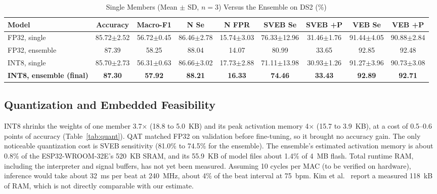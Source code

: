 \documentclass[conference]{IEEEtran}
\begin{document}
\begin{table}[t]
\caption{Single Members (Mean $\pm$ SD, $n=3$) Versus the Ensemble on DS2 (\%)}
\label{tab:ensemble}
\centering
\footnotesize
\begin{tabular}{@{}lcccccccc@{}}
\toprule
Model & Accuracy & Macro-F1 & N Se & N FPR & SVEB Se & SVEB +P & VEB Se & VEB +P \\
\midrule
FP32, single & 85.72$\pm$2.52 & 56.72$\pm$0.45 & 86.46$\pm$2.78 & 15.74$\pm$3.03 & 76.33$\pm$12.96 & 31.46$\pm$1.76 & 91.44$\pm$4.05 & 90.88$\pm$2.84 \\
FP32, ensemble & 87.39 & 58.25 & 88.04 & 14.07 & 80.99 & 33.65 & 92.85 & 92.48 \\
INT8, single & 85.70$\pm$2.73 & 56.31$\pm$0.63 & 86.66$\pm$3.02 & 17.73$\pm$2.88 & 71.11$\pm$13.98 & 30.93$\pm$1.26 & 91.27$\pm$3.96 & 90.73$\pm$3.08 \\
\textbf{INT8, ensemble (final)} & \textbf{87.30} & \textbf{57.92} & \textbf{88.21} & \textbf{16.33} & \textbf{74.46} & \textbf{33.43} & \textbf{92.89} & \textbf{92.71} \\
\bottomrule
\end{tabular}
\end{table}

\subsection{Quantization and Embedded Feasibility}
INT8 shrinks the weights of one member 3.7$\times$ (18.8 to 5.0~KB) and its peak activation memory 4$\times$ (15.7 to 3.9~KB), at a cost of 0.5--0.6 points of accuracy (Table~\ref{tab:quant}). QAT matched FP32 on validation before fine-tuning, so it brought no accuracy gain. The only noticeable quantization cost is SVEB sensitivity (81.0\% to 74.5\% for the ensemble). The ensemble's estimated activation memory is about 0.8\% of the ESP32-WROOM-32E's 520~KB SRAM, and its 55.9~KB of model files about 1.4\% of 4~MB flash. Total runtime RAM, including the interpreter and signal buffers, has not yet been measured. Assuming 10 cycles per MAC (to be verified on hardware), inference would take about 32~ms per beat at 240~MHz, about 4\% of the beat interval at 75~bpm. Kim et al.~\cite{kim2024ultraedge} report a measured 118~kB of RAM, which is not directly comparable with our estimate.
\end{document}
